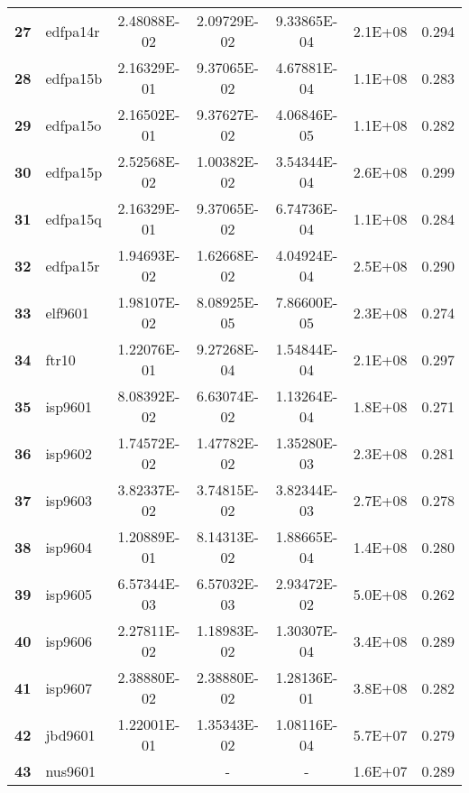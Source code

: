 \begin{longtable}{@{}llS[table-format=1.2e-2]S[table-format=1.2e-2]S[table-format=1.2e-2]S[table-format=1.2e-2]l@{}}
\textbf{27} & edfpa14r & 2.48088E-02 & 2.09729E-02 & 9.33865E-04 & 2.1E+08 & 0.294 \\
\textbf{28} & edfpa15b & 2.16329E-01 & 9.37065E-02 & 4.67881E-04 & 1.1E+08 & 0.283 \\
\textbf{29} & edfpa15o & 2.16502E-01 & 9.37627E-02 & 4.06846E-05 & 1.1E+08 & 0.282 \\
\textbf{30} & edfpa15p & 2.52568E-02 & 1.00382E-02 & 3.54344E-04 & 2.6E+08 & 0.299 \\
\textbf{31} & edfpa15q & 2.16329E-01 & 9.37065E-02 & 6.74736E-04 & 1.1E+08 & 0.284 \\
\textbf{32} & edfpa15r & 1.94693E-02 & 1.62668E-02 & 4.04924E-04 & 2.5E+08 & 0.290 \\
\textbf{33} & elf9601  & 1.98107E-02 & 8.08925E-05 & 7.86600E-05 & 2.3E+08 & 0.274 \\
\textbf{34} & ftr10    & 1.22076E-01 & 9.27268E-04 & 1.54844E-04 & 2.1E+08 & 0.297 \\
\textbf{35} & isp9601  & 8.08392E-02 & 6.63074E-02 & 1.13264E-04 & 1.8E+08 & 0.271 \\
\textbf{36} & isp9602  & 1.74572E-02 & 1.47782E-02 & 1.35280E-03 & 2.3E+08 & 0.281 \\
\textbf{37} & isp9603  & 3.82337E-02 & 3.74815E-02 & 3.82344E-03 & 2.7E+08 & 0.278 \\
\textbf{38} & isp9604  & 1.20889E-01 & 8.14313E-02 & 1.88665E-04 & 1.4E+08 & 0.280 \\
\textbf{39} & isp9605  & 6.57344E-03 & 6.57032E-03 & 2.93472E-02                         & 5.0E+08 & 0.262 \\
\textbf{40} & isp9606  & 2.27811E-02 & 1.18983E-02 & 1.30307E-04 & 3.4E+08 & 0.289 \\
\textbf{41} & isp9607  & 2.38880E-02 & 2.38880E-02 & 1.28136E-01                         & 3.8E+08 & 0.282 \\
\textbf{42} & jbd9601  & 1.22001E-01 & 1.35343E-02 & 1.08116E-04 & 5.7E+07 & 0.279 \\
\textbf{43} & nus9601  &            & -           & -                                   & 1.6E+07 & 0.289 \\* \bottomrule
\end{longtable}